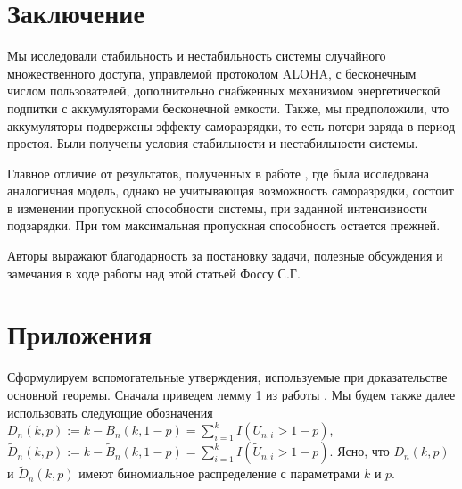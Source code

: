 \documentclass[10pt, reqno]{amsart}
\begin{document}
\section{Заключение} 
Мы исследовали стабильность и нестабильность системы случайного множественного доступа, управлемой протоколом ALOHA, с бесконечным числом пользователей, дополнительно снабженных механизмом энергетической подпитки с аккумуляторами бесконечной емкости. Также, мы предположили, что аккумуляторы подвержены эффекту саморазрядки, то есть потери заряда в период простоя. Были получены условия стабильности и нестабильности системы.

Главное отличие от результатов, полученных в работе \cite{Rezler_Chebunin}, где была исследована аналогичная модель, однако не учитывающая возможность саморазрядки, состоит в изменении пропускной способности системы, при заданной интенсивности подзарядки. При том максимальная пропускная способность остается прежней.

Авторы выражают благодарность за постановку задачи, полезные обсуждения и замечания в ходе работы над этой статьей Фоссу С.Г.

\section{Приложения}
Сформулируем вспомогательные утверждения, используемые при доказательстве основной теоремы. Сначала приведем лемму 1 из работы \cite{Foss_original}. Мы будем также далее использовать следующие обозначения $D_{n}(k, p) := k - B_{n}(k, 1-p) = \sum_{i=1}^{k}I(U_{n,i} > 1-p)$, $\widetilde{D}_{n}(k, p) := k - \widetilde{B}_{n}(k, 1-p) = \sum_{i=1}^{k}I(\widetilde{U}_{n,i} > 1-p)$. Ясно, что $D_{n}(k, p)$ и $\widetilde{D}_{n}(k, p)$ имеют биномиальное распределение с параметрами $k$ и $p$.
\end{document}
